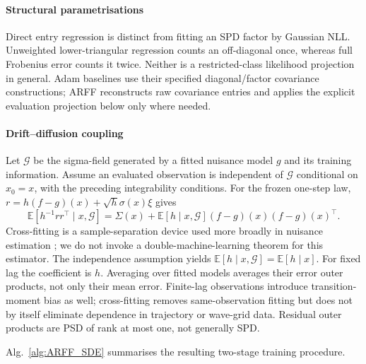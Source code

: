 \documentclass{article}
\newcommand{\E}{\mathbb{E}}
\def\E{\mathbb{E}}
\begin{document}
\paragraph{Structural parametrisations}
Direct entry regression is distinct from fitting an SPD factor by Gaussian NLL. Unweighted lower-triangular regression counts an off-diagonal once, whereas full Frobenius error counts it twice. Neither is a restricted-class likelihood projection in general. Adam baselines use their specified diagonal/factor covariance constructions; ARFF reconstructs raw covariance entries and applies the explicit evaluation projection below only where needed.

\paragraph{Drift--diffusion coupling}
Let $\mathcal G$ be the sigma-field generated by a fitted nuisance model $g$ and its training information. Assume an evaluated observation is independent of $\mathcal G$ conditional on $x_0=x$, with the preceding integrability conditions. For the frozen one-step law, $r=h(f-g)(x)+\sqrt h\sigma(x)\xi$ gives
\[
\E[h^{-1}rr^\top\mid x,\mathcal G]
=\Sigma(x)+\E[h\mid x,\mathcal G](f-g)(x)(f-g)(x)^\top.
\]
Cross-fitting is a sample-separation device used more broadly in nuisance estimation \citep{chernozhukov2018}; we do not invoke a double-machine-learning theorem for this estimator. The independence assumption yields $\E[h\mid x,\mathcal G]=\E[h\mid x]$. For fixed lag the coefficient is $h$. Averaging over fitted models averages their error outer products, not only their mean error. Finite-lag observations introduce transition-moment bias as well; cross-fitting removes same-observation fitting but does not by itself eliminate dependence in trajectory or wave-grid data. Residual outer products are PSD of rank at most one, not generally SPD.

Alg.~\ref{alg:ARFF_SDE} summarises the resulting two-stage training procedure.
\end{document}
